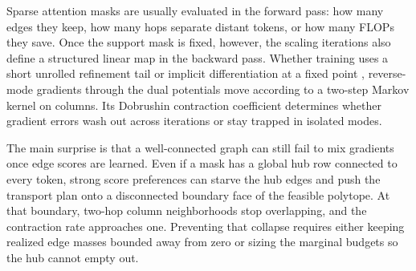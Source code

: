 \documentclass[10pt]{article}
\begin{document}
Sparse attention masks are usually evaluated in the forward pass: how many edges they keep, how many hops separate distant tokens, or how many FLOPs they save. Once the support mask is fixed, however, the scaling iterations also define a structured linear map in the backward pass. Whether training uses a short unrolled refinement tail \citep{forde2026blockwise} or implicit differentiation at a fixed point \citep{luise2018differential,eisenberger2022unified,pauwels2023derivatives}, reverse-mode gradients through the dual potentials move according to a two-step Markov kernel on columns. Its Dobrushin contraction coefficient determines whether gradient errors wash out across iterations or stay trapped in isolated modes.

The main surprise is that a well-connected graph can still fail to mix gradients once edge scores are learned. Even if a mask has a global hub row connected to every token, strong score preferences can starve the hub edges and push the transport plan onto a disconnected boundary face of the feasible polytope. At that boundary, two-hop column neighborhoods stop overlapping, and the contraction rate approaches one. Preventing that collapse requires either keeping realized edge masses bounded away from zero or sizing the marginal budgets so the hub cannot empty out.
\end{document}
